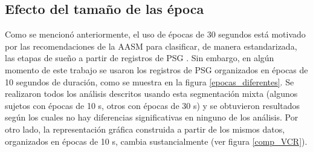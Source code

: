 \subsection{Efecto del tamaño de las época}

Como se mencionó anteriormente, el uso de épocas de 30 segundos está motivado por las 
recomendaciones de la AASM para clasificar, de manera estandarizada, las etapas de sueño a partir de 
registros de PSG \cite{AASM07}. 
Sin embargo, en algún momento de este trabajo se usaron los registros de PSG organizados en 
épocas de 10 segundos de duración, como se muestra en la figura \ref{epocas_diferentes}. 
Se realizaron todos los análisis descritos usando esta segmentación mixta (algunos sujetos con 
épocas de 10 s, otros con épocas de 30 s) y se obtuvieron resultados según los cuales no hay 
diferencias significativas en ninguno de los análisis. 
Por otro lado, la representación gráfica construida a partir de los mismos datos, organizados
en épocas de 10 s, cambia sustancialmente (ver figura \ref{comp_VCR}).

